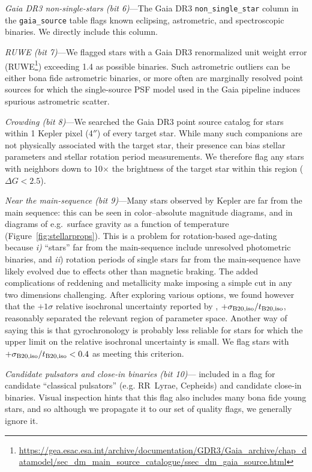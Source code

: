 \documentclass[11pt,twocolumn,tighten]{aastex63}
\begin{document}
{\it Gaia DR3 non-single-stars (bit 6)}---The Gaia DR3
\texttt{non\_single\_star} column in the \texttt{gaia\_source} table
flags known eclipsing, astrometric, and spectroscopic binaries.  We
directly include this column.

{\it RUWE (bit 7)}---We flagged stars with a Gaia DR3 renormalized
unit weight error
(RUWE\footnote{\url{https://gea.esac.esa.int/archive/documentation/GDR3/Gaia_archive/chap_datamodel/sec_dm_main_source_catalogue/ssec_dm_gaia_source.html}})
exceeding 1.4 as possible binaries.  Such astrometric outliers can be
either bona fide astrometric binaries, or more often are marginally
resolved point sources for which the single-source PSF model used in
the Gaia pipeline induces spurious astrometric scatter.

{\it Crowding (bit 8)}---We searched the Gaia DR3 point source catalog
for stars within 1 Kepler pixel (4$''$) of every target star.  While
many such companions are not physically associated with the target
star, their presence can bias stellar parameters and stellar rotation
period measurements.  We therefore flag any stars with neighbors down
to 10$\times$ the brightness of the target star within this region
($\Delta G < 2.5$).

{\it Near the main-sequence (bit 9)}---Many stars observed by Kepler
are far from the main sequence: this can be seen in color--absolute
magnitude diagrams, and in diagrams of e.g.~surface gravity as a
function of temperature (Figure~\ref{fig:stellarprops}).  This is a
problem for rotation-based age-dating because {\it i)} ``stars'' far
from the main-sequence include unresolved photometric binaries, and
{\it ii}) rotation periods of single stars far from the main-sequence
have likely evolved due to effects other than magnetic braking.  The
added complications of reddening and metallicity make imposing a
simple cut in any two dimensions challenging.  After exploring various
options, we found however that the $+1$$\sigma$ relative isochronal
uncertainty reported by \citet{Berger_2020a_catalog}, $+\sigma_{\rm
B20,iso}/t_{\rm B20,iso}$, reasonably separated the relevant region of
parameter space.  Another way of saying this is that gyrochronology is
probably less reliable for stars for which the upper limit on the
relative isochronal uncertainty is small.
We flag stars with $+\sigma_{\rm B20,iso}/t_{\rm B20,iso} < 0.4$ as
meeting this criterion.

{\it Candidate pulsators and close-in binaries (bit
10)}---\citeauthor{Santos_2021} included in a flag for candidate
``classical pulsators'' (e.g. RR~Lyrae, Cepheids) and candidate
close-in binaries.  Visual inspection hints that this flag also
includes many bona fide young stars, and so although we propagate it 
to our set of quality flags, we generally ignore it.
\end{document}
